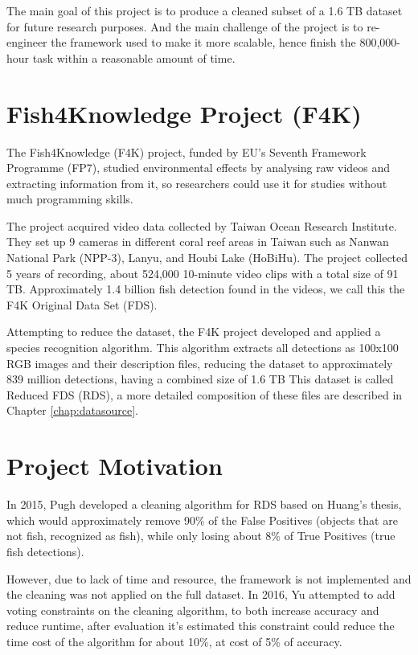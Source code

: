\documentclass[bsc,logo,twoside,fullspacing,parskip]{infthesis}
\begin{document}

The main goal of this project is to produce a cleaned subset of a 1.6 TB dataset for future research purposes. And the main challenge of the project is to re-engineer the framework used to make it more scalable, hence finish the 800,000-hour task within a reasonable amount of time.

\section{Fish4Knowledge Project (F4K)}

The Fish4Knowledge (F4K) project, funded by EU's Seventh Framework Programme (FP7), studied environmental effects by analysing raw videos and extracting information from it, so researchers could use it for studies without much programming skills. 

The project acquired video data collected by Taiwan Ocean Research Institute. 
They set up 9 cameras in different coral reef areas in Taiwan such as Nanwan National Park (NPP-3), Lanyu, and Houbi Lake (HoBiHu). 
The project collected 5 years of recording, about 524,000 10-minute video clips with a total size of 91 TB. Approximately 1.4 billion fish detection found in the videos, we call this the F4K Original Data Set (FDS). 

Attempting to reduce the dataset, the F4K project developed and applied a species recognition algorithm. 
This algorithm extracts all detections as 100x100 RGB images and their description files, reducing the dataset to approximately 839 million detections, having a combined size of 1.6 TB
This dataset is called Reduced FDS (RDS), a more detailed composition of these files are described in Chapter \ref{chap:datasource}.

\section{Project Motivation}

In 2015, Pugh\cite{Pugh} developed a cleaning algorithm for RDS based on Huang's thesis\cite{Huang}, which would approximately remove 90\% of the False Positives (objects that are not fish, recognized as fish), while only losing about 8\% of True Positives (true fish detections). 

However, due to lack of time and resource, the framework is not implemented and the cleaning was not applied on the full dataset.
In 2016, Yu\cite{Yu} attempted to add voting constraints on the cleaning algorithm, to both increase accuracy and reduce runtime, after evaluation it's estimated this constraint could reduce the time cost of the algorithm for about 10\%, at cost of 5\% of accuracy.
\end{document}

